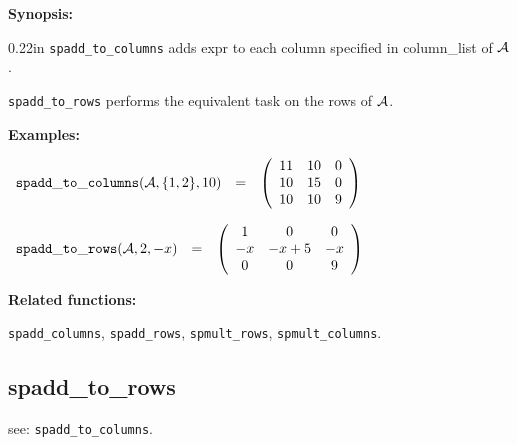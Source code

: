 {\bf Synopsis:}

\begin{addtolength}{\leftskip}{0.22in}
{\tt spadd\_to\_columns} adds expr to each column specified in 
column\_list of ${\cal A}$.  

{\tt spadd\_to\_rows} performs the equivalent task on the rows of 
${\cal A}$.

\end{addtolength}

{\bf Examples:}

\begin{flushleft}  
\hspace*{0.175in}
\begin{math}
\begin{array}{ccc}
{\tt spadd\_to\_columns}({\cal A},\{1,2\},10) & = & 
\left( \begin{array}{ccc} 11 & 10 & 0 \\ 10 & 15 & 0 \\ 10 & 10 & 9 
\end{array} \right)  
\end{array}
\end{math}
\end{flushleft}

\vspace*{0.1in}

\begin{flushleft}  
\hspace*{0.175in}
\begin{math}
\begin{array}{ccc}
{\tt spadd\_to\_rows}({\cal A},2,-x) & = & 
\left( \begin{array}{ccc} 1 & 0 & 0 \\ -x & -x+5 & -x \\ 0 & 0 & 9 
\end{array} \right)  
\end{array}
\end{math}
\end{flushleft}

{\bf Related functions:}

\hspace*{0.175in} 
{\tt spadd\_columns}, {\tt spadd\_rows}, {\tt spmult\_rows}, 
{\tt spmult\_columns}.


\subsection{spadd\_to\_rows}

\hspace*{0.175in} see: {\tt spadd\_to\_columns}.


